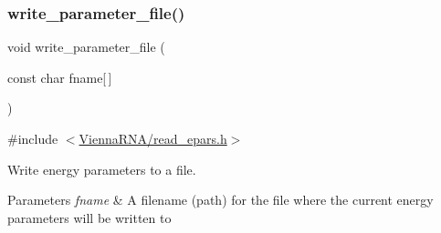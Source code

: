 \subsubsection{\texorpdfstring{write\+\_\+parameter\+\_\+file()}{write\_parameter\_file()}}
{\footnotesize\ttfamily void write\+\_\+parameter\+\_\+file (\begin{DoxyParamCaption}\item[{const char}]{fname\mbox{[}$\,$\mbox{]} }\end{DoxyParamCaption})}



{\ttfamily \#include $<$\hyperlink{read__epars_8h}{Vienna\+R\+N\+A/read\+\_\+epars.\+h}$>$}



Write energy parameters to a file. 


\begin{DoxyParams}{Parameters}
{\em fname} & A filename (path) for the file where the current energy parameters will be written to \\
\hline
\end{DoxyParams}
